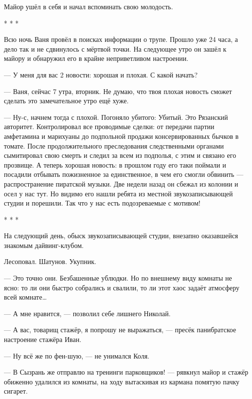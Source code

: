 Майор ушёл в себя и начал вспоминать свою молодость.


\begin{center}* * *\end{center}


Всю ночь Ваня провёл в поисках информации о трупе. Прошло уже 24 часа, а дело так и не сдвинулось с мёртвой точки. На следующее утро он зашёл к майору и обнаружил его в крайне неприветливом настроении.



--- У меня для вас 2 новости: хорошая и плохая. С какой начать?



--- Ваня, сейчас 7 утра, вторник. Не думаю, что твоя плохая новость сможет сделать это замечательное утро ещё хуже.



--- Ну-с, начнем тогда с плохой. Погоняло убитого: Убитый. Это Рязанский авторитет. Контролировал все проводимые сделки: от передачи партии амфетамина и марихуаны до подпольной продажи консервированных бычков в томате. После продолжительного преследования следственными органами сымитировал свою смерть и следил за всем из подполья, с этим и связано его прозвище. А теперь хорошая новость: в прошлом году его таки поймали и посадили отбывать пожизненное за единственное, в чем его смогли обвинить --- распространение пиратской музыки. Две недели назад он сбежал из колонии и осел у нас тут. Но видимо его нашли ребята из местной звукозаписывающей студии и порешили. Так что у нас есть подозреваемые с мотивом!


\begin{center}* * *\end{center}


На следующий день, обыск звукозаписывающей студии, внезапно оказавшейся знакомым дайвинг-клубом.


Лесоповал. Шатунов. Укупник.



--- Это точно они. Безбашенные ублюдки. Но по внешнему виду комнаты не ясно: то ли они быстро собрались и свалили, то ли этот хаос задаёт атмосферу всей комнате…

--- А мне нравится, --- позволил себе лишнего Николай.

--- А вас, товарищ стажёр, я попрошу не выражаться, --- пресёк панибратское настроение стажёра Иван.

--- Ну всё же по фен-шую, --- не унимался Коля.

--- В Сызрань же отправлю на тренинги парковщиков! --- рявкнул майор и стажёр обиженно удалился из комнаты, на ходу вытаскивая из кармана помятую пачку сигарет.


